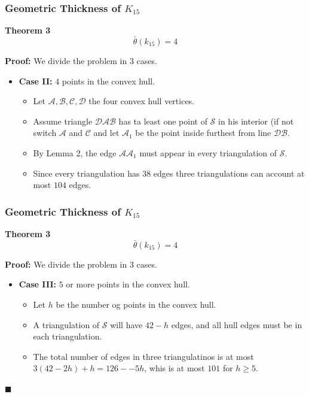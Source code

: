 \documentclass[12 pt]{beamer}
\begin{document}
\begin{frame}{}
    \frametitle{Geometric Thickness of $K_{15}$}
    
    \begin{block}{\textbf{Theorem 3}}
    $$\bar{\theta} (k_{15}) = 4 $$
    \end{block}

    \textbf{Proof:}
    We divide the problem in $3$ cases.
    
    \begin{itemize}
    \item \textbf{Case II:} $4$ points in the convex hull. 
        \begin{itemize}
            \item Let $\mathcal{A, B, C, D}$ the four convex hull vertices.
            \item Assume triangle $\mathcal{DAB}$ has ta least one point of $\mathcal{S}$ in his interior (if not switch $\mathcal{A}$ and $\mathcal{C}$ and let $\mathcal{A}_{1}$ be the point inside furthest from line $\mathcal{DB}$.
            \item By Lemma 2, the edge $\mathcal{AA}_{1}$ must appear in every triangulation of $\mathcal{S}$.
            \item Since every triangulation has $38$ edges three triangulations can account at most $104$ edges.
        \end{itemize}
    \end{itemize}
\end{frame} 

\begin{frame}{}
    \frametitle{Geometric Thickness of $K_{15}$}
    
    \begin{block}{\textbf{Theorem 3}}
    $$\bar{\theta} (k_{15}) = 4 $$
    \end{block}

    \textbf{Proof:}
    We divide the problem in $3$ cases.
    
    \begin{itemize}
    \item \textbf{Case III:} $5$ or more points in the convex hull. 
        \begin{itemize}
            \item Let $h$ be the number og points in the convex hull.
            \item A triangulation of $\mathcal{S}$ will have $42 - h$ edges, and all hull edges must be in each triangulation.
            \item The total number of edges in three triangulatinos is at most $3(42 -  2h) + h = 126 - -5h$, whis is at most $101$ for $h \geq 5$.
        \end{itemize}
    \end{itemize}
    
    \begin{flushright}
    $\blacksquare$
    \end{flushright}
\end{frame} 
\end{document}
